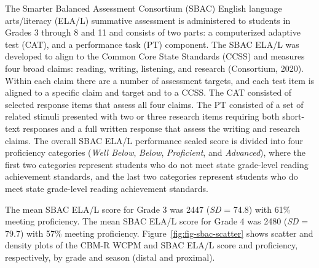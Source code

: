 \documentclass[
  english,
  man, fleqn, noextraspace]{apa6}
\begin{document}
The Smarter Balanced Assessment Consortium (SBAC) English language arts/literacy (ELA/L) summative assessment is administered to students in Grades 3 through 8 and 11 and consists of two parts: a computerized adaptive test (CAT), and a performance task (PT) component. The SBAC ELA/L was developed to align to the Common Core State Standards (CCSS) and measures four broad claims: reading, writing, listening, and research (Consortium, 2020). Within each claim there are a number of assessment targets, and each test item is aligned to a specific claim and target and to a CCSS. The CAT consisted of selected response items that assess all four claims. The PT consisted of a set of related stimuli presented with two or three research items requiring both short-text responses and a full written response that assess the writing and research claims. The overall SBAC ELA/L performance scaled score is divided into four proficiency categories (\emph{Well Below}, \emph{Below}, \emph{Proficient}, and \emph{Advanced}), where the first two categories represent students who do not meet state grade-level reading achievement standards, and the last two categories represent students who do meet state grade-level reading achievement standards.

The mean SBAC ELA/L score for Grade 3 was 2447 (\emph{SD} = 74.8) with 61\% meeting proficiency. The mean SBAC ELA/L score for Grade 4 was 2480 (\emph{SD} = 79.7) with 57\% meeting proficiency. Figure~\ref{fig:fig-sbac-scatter} shows scatter and density plots of the CBM-R WCPM and SBAC ELA/L score and proficiency, respectively, by grade and season (distal and proximal).
\end{document}
